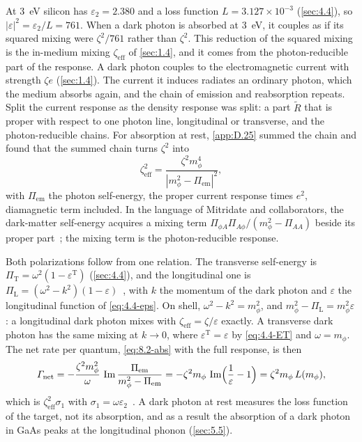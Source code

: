 At \SI{3}{eV} silicon has $\varepsilon_2 = 2.380$ and a loss function $L = 3.127\times10^{-3}$ (\cref{sec:4.4}), so $|\varepsilon|^2 = \varepsilon_2/L = 761$. When a dark photon is absorbed at \SI{3}{eV}, it couples as if its squared mixing were $\zeta^2/761$ rather than $\zeta^2$. This reduction of the squared mixing is the in-medium mixing $\zeta_{\mathrm{eff}}$ of \cref{sec:1.4}, and it comes from the photon-reducible part of the response. A dark photon couples to the electromagnetic current with strength $\zeta e$ (\cref{sec:1.4}). The current it induces radiates an ordinary photon, which the medium absorbs again, and the chain of emission and reabsorption repeats. Split the current response as the density response was split: a part $\tilde R$ that is proper with respect to one photon line, longitudinal or transverse, and the photon-reducible chains. For absorption at rest, \cref{app:D.25} summed the chain and found that the summed chain turns $\zeta^2$ into
\begin{equation}
  \zeta_{\mathrm{eff}}^2 = \frac{\zeta^2m_\phi^4}{|m_\phi^2 - \Pi_{\mathrm{em}}|^2} ,
  \label{eq:8.4-zetaeff}
\end{equation}
with $\Pi_{\mathrm{em}}$ the photon self-energy, the proper current response times $e^2$, diamagnetic term included. In the language of Mitridate and collaborators, the dark-matter self-energy acquires a mixing term $\Pi_{\phi A}\Pi_{A\phi}/(m_\phi^2 - \Pi_{AA})$ beside its proper part~\cite[Eqs.~(20)--(22)]{mitridate2021dark}; the mixing term is the photon-reducible response.

Both polarizations follow from one relation. The transverse self-energy is $\Pi_{\mathrm{T}} = \omega^2(1 - \varepsilon^{\mathrm{T}})$ (\cref{sec:4.4}), and the longitudinal one is $\Pi_{\mathrm{L}} = (\omega^2 - k^2)(1 - \varepsilon)$~\cite[Eq.~(34)]{mitridate2021dark}, with $k$ the momentum of the dark photon and $\varepsilon$ the longitudinal function of \cref{eq:4.4-eps}. On shell, $\omega^2 - k^2 = m_\phi^2$, and $m_\phi^2 - \Pi_{\mathrm{L}} = m_\phi^2\varepsilon$: a longitudinal dark photon mixes with $\zeta_{\mathrm{eff}} = \zeta/\varepsilon$ exactly. A transverse dark photon has the same mixing at $k \to 0$, where $\varepsilon^{\mathrm{T}} = \varepsilon$ by \cref{eq:4.4-ET} and $\omega = m_\phi$. The net rate per quantum, \cref{eq:8.2-abs} with the full response, is then
\begin{equation*}
  \varGamma_{\mathrm{net}} = -\frac{\zeta^2m_\phi^2}{\omega}\,\operatorname{Im}\frac{\Pi_{\mathrm{em}}}{m_\phi^2 - \Pi_{\mathrm{em}}} = -\zeta^2m_\phi\,\operatorname{Im}\Bigl(\frac{1}{\varepsilon} - 1\Bigr) = \zeta^2m_\phi\,L(m_\phi) ,
\end{equation*}
which is $\zeta_{\mathrm{eff}}^2\sigma_1$ with $\sigma_1 = \omega\varepsilon_2$~\cite[Eq.~(40)]{mitridate2021dark}. A dark photon at rest measures the loss function of the target, not its absorption, and as a result the absorption of a dark photon in GaAs peaks at the longitudinal phonon (\cref{sec:5.5}).

